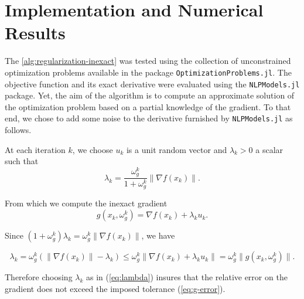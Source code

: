 \documentclass[runningheads,orivec,oribibl]{llncs}
\begin{document}

\section{Implementation and Numerical Results}
\label{sec:implementation}

The \autoref{alg:regularization-inexact} was tested using the collection of unconstrained optimization problems available in the package \texttt{OptimizationProblems.jl}.
The objective function and its exact derivative were evaluated using the \texttt{NLPModels.jl} package.
Yet, the aim of the algorithm is to compute an approximate solution of the optimization problem based on a partial knowledge of the gradient.
To that end, we chose to add some noise to the derivative furnished by \texttt{NLPModels.jl} as follows.

At each iteration \(k\), we choose \(u_k\) is a unit random vector and \(\lambda_k > 0\) a scalar such that
\begin{equation}
  \label{eq:lambda}
  \lambda_k = \frac{\omega_g^k}{1+\omega_g^k}\|\nabla f(x_k)\|.
\end{equation}

\noindent From which we compute the inexact gradient
\begin{equation}
  g(x_k,\omega_g^k) = \nabla f(x_k) + \lambda_k u_k.
\end{equation}

\noindent Since $(1+\omega_g^k) \lambda_k = \omega_g^k \|\nabla f(x_k)\|$, we have

\begin{equation*}
  \lambda_k =
  \omega_g^k(\|\nabla f(x_k)\| - \lambda_k)
  \leq \omega_g^k\|\nabla f(x_k) + \lambda_k u_k\| = \omega_g^k \|g(x_k,\omega_g^k)\|.
\end{equation*}

\noindent Therefore choosing $\lambda_k$ as in (\ref{eq:lambda}) insures that the relative error on the gradient does not exceed the imposed tolerance (\ref{eq:g-error}).


\end{document}
